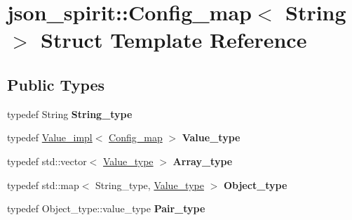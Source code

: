\hypertarget{structjson__spirit_1_1_config__map}{}\section{json\+\_\+spirit\+::Config\+\_\+map$<$ String $>$ Struct Template Reference}
\label{structjson__spirit_1_1_config__map}
\subsection*{Public Types}
\begin{DoxyCompactItemize}
\item 
\mbox{\label{structjson__spirit_1_1_config__map_abcfbacb1047e017b281210332f574b87}} 
typedef String {\bfseries String\+\_\+type}
\item 
\mbox{\label{structjson__spirit_1_1_config__map_a1beec86663fb1ca76e98852b93a90c5c}} 
typedef \mbox{\hyperlink{classjson__spirit_1_1_value__impl}{Value\+\_\+impl}}$<$ \mbox{\hyperlink{structjson__spirit_1_1_config__map}{Config\+\_\+map}} $>$ {\bfseries Value\+\_\+type}
\item 
\mbox{\label{structjson__spirit_1_1_config__map_a2efd6f753201c1c08c30d96e27c192d7}} 
typedef std\+::vector$<$ \mbox{\hyperlink{classjson__spirit_1_1_value__impl}{Value\+\_\+type}} $>$ {\bfseries Array\+\_\+type}
\item 
\mbox{\label{structjson__spirit_1_1_config__map_a64fd50a8a903e22e3909e83244a0c92f}} 
typedef std\+::map$<$ String\+\_\+type, \mbox{\hyperlink{classjson__spirit_1_1_value__impl}{Value\+\_\+type}} $>$ {\bfseries Object\+\_\+type}
\item 
\mbox{\label{structjson__spirit_1_1_config__map_a2fe4847e01358c060b7a20cfce43305c}} 
typedef Object\+\_\+type\+::value\+\_\+type {\bfseries Pair\+\_\+type}
\end{DoxyCompactItemize}
